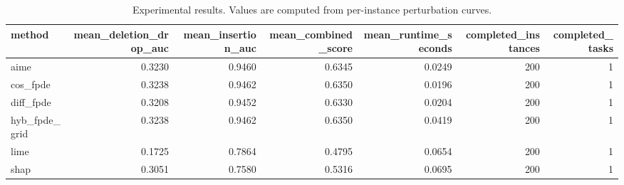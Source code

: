 \begin{table}[t]
\caption{Experimental results. Values are computed from per-instance perturbation curves.}
\label{tab:main_results_computed}
\centering
\begin{tabular}{lrrrrrr}
\toprule
method & mean\_deletion\_drop\_auc & mean\_insertion\_auc & mean\_combined\_score & mean\_runtime\_seconds & completed\_instances & completed\_tasks \\
\midrule
aime & 0.3230 & 0.9460 & 0.6345 & 0.0249 & 200 & 1 \\
cos\_fpde & 0.3238 & 0.9462 & 0.6350 & 0.0196 & 200 & 1 \\
diff\_fpde & 0.3208 & 0.9452 & 0.6330 & 0.0204 & 200 & 1 \\
hyb\_fpde\_grid & 0.3238 & 0.9462 & 0.6350 & 0.0419 & 200 & 1 \\
lime & 0.1725 & 0.7864 & 0.4795 & 0.0654 & 200 & 1 \\
shap & 0.3051 & 0.7580 & 0.5316 & 0.0695 & 200 & 1 \\
\bottomrule
\end{tabular}

\end{table}
